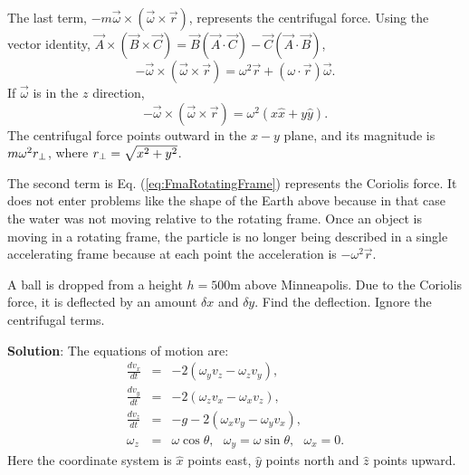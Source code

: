 The last term, $-m\vec{\omega}\times(\vec{\omega}\times\vec{r})$, represents the centrifugal force. Using the vector identity, 
$\vec{A}\times(\vec{B}\times\vec{C})=\vec{B}(\vec{A}\cdot{\vec{C}})-\vec{C}(\vec{A}\cdot\vec{B})$,
\begin{equation}
-\vec{\omega}\times(\vec{\omega}\times\vec{r})=\omega^2\vec{r}+(\omega\cdot\vec{r})\vec{\omega}.
\end{equation}
If $\vec{\omega}$ is in the $z$ direction,
\begin{equation}
-\vec{\omega}\times(\vec{\omega}\times\vec{r})=\omega^2(x\hat{x}+y\hat{y}).
\end{equation}
The centrifugal force points outward in the $x-y$ plane, and its magnitude is $m\omega^2r_{\rm\perp}$, where $r_{\rm\perp}=\sqrt{x^2+y^2}$.

The second term is Eq. (\ref{eq:FmaRotatingFrame}) represents the Coriolis force. It does not enter problems like the shape of the Earth above because in that case the water was not moving relative to the rotating frame. Once an object is moving in a rotating frame, the particle is no longer being described in a single accelerating frame because at each point the acceleration is $-\omega^2\vec{r}$. 

\example
A ball is dropped from a height $h=500$m above Minneapolis. Due to the Coriolis force, it is deflected by an amount $\delta x$ and $\delta y$. Find the deflection. Ignore the centrifugal terms.

{\bf Solution}: The equations of motion are:
\begin{eqnarray*}
\frac{dv_x}{dt}&=&-2(\omega_yv_z-\omega_zv_y),\\
\frac{dv_y}{dt}&=&-2(\omega_zv_x-\omega_xv_z),\\
\frac{dv_z}{dt}&=&-g-2(\omega_xv_y-\omega_yv_x),\\
\omega_z&=&\omega\cos\theta,~~~\omega_y=\omega\sin\theta,~~~\omega_x=0.
\end{eqnarray*}
Here the coordinate system is $\hat{x}$ points east, $\hat{y}$ points north and $\hat{z}$ points upward.


